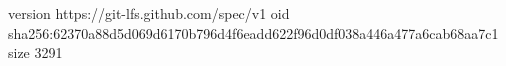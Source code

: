 version https://git-lfs.github.com/spec/v1
oid sha256:62370a88d5d069d6170b796d4f6eadd622f96d0df038a446a477a6cab68aa7c1
size 3291
